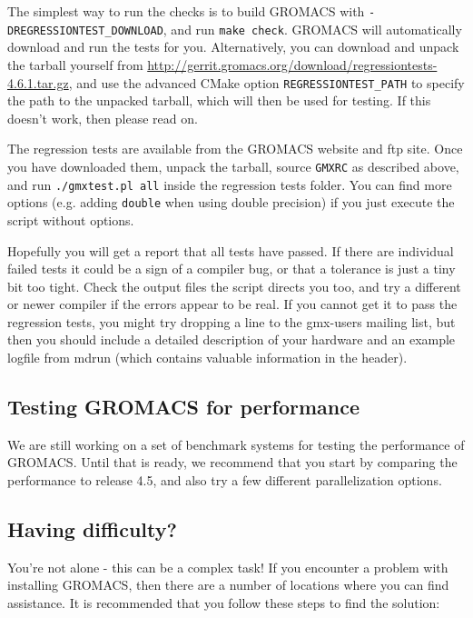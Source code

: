 \documentclass{article}[12pt,a4paper,twoside]
\newcommand{\gromacs}{GROMACS}
\newcommand{\cmake}{CMake}
\begin{document}
The simplest way to run the checks is to build \gromacs{} with
\verb+-DREGRESSIONTEST_DOWNLOAD+, and run \verb+make check+.
\gromacs{} will automatically download and run the tests for you.
Alternatively, you can download and unpack the tarball yourself from
\url{http://gerrit.gromacs.org/download/regressiontests-4.6.1.tar.gz},
and use the advanced \cmake{} option \verb+REGRESSIONTEST_PATH+ to
specify the path to the unpacked tarball, which will then be used for
testing. If this doesn't work, then please read on.

The regression tests are available from the \gromacs{} website and ftp
site.  Once you have downloaded them, unpack the tarball, source
\verb+GMXRC+ as described above, and run \verb+./gmxtest.pl all+
inside the regression tests folder. You can find more options
(e.g. adding \verb+double+ when using double precision) if you just
execute the script without options.

Hopefully you will get a report that all tests have passed. If there
are individual failed tests it could be a sign of a compiler bug, or
that a tolerance is just a tiny bit too tight. Check the output files
the script directs you too, and try a different or newer compiler if
the errors appear to be real. If you cannot get it to pass the
regression tests, you might try dropping a line to the gmx-users
mailing list, but then you should include a detailed description of
your hardware and an example logfile from mdrun (which contains
valuable information in the header).

\subsection{Testing \gromacs{} for performance}
We are still working on a set of benchmark systems for testing
the performance of \gromacs{}. Until that is ready, we recommend that
you start by comparing the performance to release 4.5, and also try
a few different parallelization options.

\subsection{Having difficulty?}
You're not alone - this can be a complex task! If you encounter a
problem with installing \gromacs{}, then there are a number of
locations where you can find assistance. It is recommended that you
follow these steps to find the solution:
\end{document}

